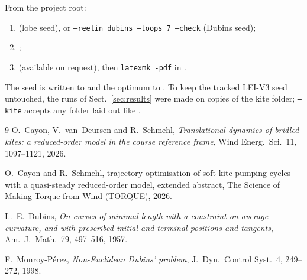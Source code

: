 \documentclass[11pt,a4paper]{article}
\newcommand{\code}[1]{\texttt{\small #1}}
\begin{document}
From the project root:
\begin{enumerate}
  \item {}
        (lobe seed), or \code{--reelin dubins --loops 7 --check} (Dubins seed);
  \item {};
  \item {} (available on request),
        then \code{latexmk -pdf} in .
\end{enumerate}
The seed is written to 
and the optimum to . To
keep the tracked LEI-V3 seed untouched, the runs of Sect.~\ref{sec:results}
were made on copies of the kite folder; \code{--kite} accepts any folder laid
out like .

\begin{thebibliography}{9}
O.~Cayon, V.~van~Deursen and R.~Schmehl,
\emph{Translational dynamics of bridled kites: a reduced-order model in the
course reference frame}, Wind Energ.\ Sci.\ 11, 1097--1121, 2026.

O.~Cayon and R.~Schmehl, trajectory optimisation of soft-kite pumping cycles
with a quasi-steady reduced-order model, extended abstract,
The Science of Making Torque from Wind (TORQUE), 2026.

L.~E.~Dubins,
\emph{On curves of minimal length with a constraint on average curvature, and
with prescribed initial and terminal positions and tangents},
Am.\ J.\ Math.\ 79, 497--516, 1957.

F.~Monroy-P\'erez,
\emph{Non-Euclidean Dubins' problem},
J.\ Dyn.\ Control Syst.\ 4, 249--272, 1998.
\end{thebibliography}
\end{document}
